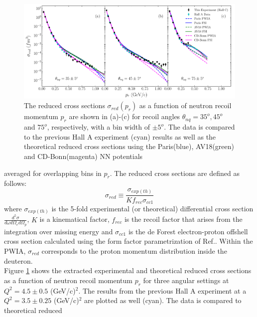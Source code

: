 \begin{center}
\begin{figure}[hb!]
\includegraphics[scale=0.50]{../prl_plots/PRL_plot1.pdf}
\caption{The reduced cross sections $\sigma_{red}(p_{r})$ as a function of neutron recoil momentum $p_{r}$ are shown in (a)-(c) for recoil angles $\theta_{nq}=35^{o}, 45^{o}$ and $75^{o}$, respectively,
with a bin width of $\pm 5^{o}$. The data is compared to the previous Hall A experiment (cyan) results\cite{PhysRevLett.107.262501} as well as the theoretical reduced cross sections using the Paris(blue),
AV18(green) and CD-Bonn(magenta) NN potentials}
\label{fig:fig1}
\end{figure}
\end{center}
\twocolumngrid
\noindent averaged for overlapping bins in $p_{r}$. The reduced cross sections are defined as follows:
\begin{equation}
\sigma_{red} \equiv \frac{\sigma_{exp(th)}}{Kf_{rec}\sigma_{cc1}}
\label{eq:1}
\end{equation}
where $\sigma_{exp(th)}$ is the 5-fold experimental (or theoretical) differential cross section $\frac{d^{5}\sigma}{d\omega d\Omega_{e} d\Omega_{p}}$, $K$ is a kinematical factor, $f_{rec}$ is the recoil factor that arises from the
integration over missing energy and $\sigma_{cc1}$ is the de Forest\cite{DEFOREST1983} electron-proton offshell cross section calculated using the form factor parametrization of Ref.\cite{PhysRevC.69.022201}.
Within the PWIA, $\sigma_{red}$ corresponds to the proton momentum distribution inside the deuteron. \\
\indent Figure \ref{fig:fig1} shows the extracted experimental and theoretical reduced cross sections as a function of neutron recoil momentum $p_{r}$ for three angular settings at $Q^{2}=4.5\pm0.5$
(GeV/c)$^{2}$. The results from the previous Hall A experiment\cite{PhysRevLett.107.262501} at a $Q^{2}=3.5\pm0.25$ (GeV/c)$^{2}$ are plotted as well (cyan). The data is compared to theoretical reduced
